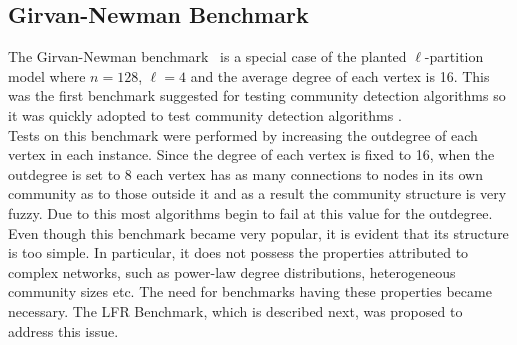 \begin{spacing}{1.5}
\subsection{Girvan-Newman Benchmark}
\indent The Girvan-Newman benchmark~\cite{Girvan11062002} is a special case of the planted $\ell$-partition model where $n = 128$, $\ell = 4$ and the average degree of each vertex is 16.  This was the first benchmark suggested for testing community detection algorithms so it was quickly adopted to test community detection algorithms .\\
\indent Tests on this benchmark were performed by increasing the outdegree of each vertex in each instance. Since the degree of each vertex is fixed to 16, when the outdegree is set to 8 each vertex has as many connections to nodes in its own community as to those outside it and as a result the community structure is very fuzzy. Due to this most algorithms begin to fail at this value for the outdegree.\\
\indent Even though this benchmark became very popular, it is evident that its structure is too simple. In particular, it does not possess the properties attributed to complex networks, such as power-law degree distributions, heterogeneous community sizes etc. The need for benchmarks having these properties became necessary. The LFR Benchmark, which is described next, was proposed to address this issue.

\end{spacing}
